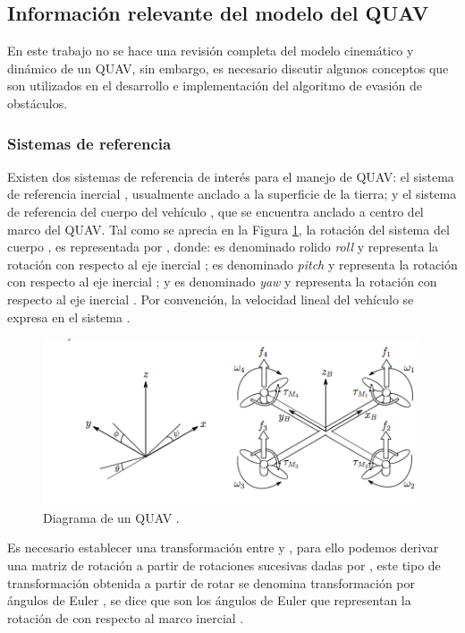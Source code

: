 \subsection{Información relevante del modelo del QUAV}

En este trabajo no se hace una revisión completa del modelo cinemático y dinámico de un QUAV, sin embargo, es necesario discutir algunos conceptos que son utilizados en el desarrollo e implementación del algoritmo de evasión de obstáculos.

\subsubsection*{Sistemas de referencia}

Existen dos sistemas de referencia de interés para el manejo de QUAV: el sistema de referencia inercial , usualmente anclado a la superficie de la tierra; y el sistema de referencia del cuerpo del vehículo , que se encuentra anclado a centro del marco del QUAV. Tal como se aprecia en la Figura \ref{fig:QUAV-model}, la rotación del sistema del cuerpo , es representada por \jim{\phi,\theta,\psi} \cite{multidrone2015modeling}, donde: \jim{\phi} es denominado rolido \textit{roll} y representa la rotación con respecto al eje inercial ; \jim{\theta} es denominado \textit{pitch} y representa la rotación con respecto al eje inercial ; y \jim{\psi} es denominado \textit{yaw} y representa la rotación con respecto al eje inercial . Por convención, la velocidad lineal del vehículo  se expresa en el sistema .

\begin{figure}[H]
    \centering
    \includegraphics[scale=0.65]{partes/img/QUAV-model.png}
    \caption[Diagrama de un QUAV.]{Diagrama de un QUAV \cite{multidrone2015modeling}.} 
    \label{fig:QUAV-model}
\end{figure}

Es necesario establecer una transformación entre  y , para ello podemos derivar una matriz de rotación a partir de rotaciones sucesivas dadas por \jim{\phi,\theta,\psi}, este tipo de transformación obtenida a partir de rotar \jim{\phi,\theta,\psi} se denomina transformación por ángulos de Euler \cite{eulerAngles}, se dice que \jim{\phi,\theta,\psi} son los ángulos de Euler que representan la rotación de  con respecto al marco inercial .


